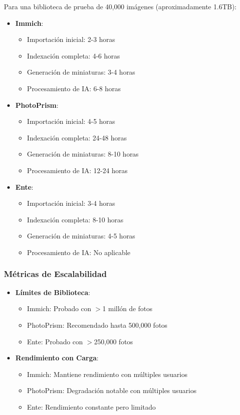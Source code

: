 Para una biblioteca de prueba de 40,000 imágenes (aproximadamente 1.6TB):

\begin{itemize}
    \item \textbf{Immich}:
    \begin{itemize}
        \item Importación inicial: 2-3 horas
        \item Indexación completa: 4-6 horas
        \item Generación de miniaturas: 3-4 horas
        \item Procesamiento de IA: 6-8 horas
    \end{itemize}

    \item \textbf{PhotoPrism}:
    \begin{itemize}
        \item Importación inicial: 4-5 horas
        \item Indexación completa: 24-48 horas
        \item Generación de miniaturas: 8-10 horas
        \item Procesamiento de IA: 12-24 horas
    \end{itemize}

    \item \textbf{Ente}:
    \begin{itemize}
        \item Importación inicial: 3-4 horas
        \item Indexación completa: 8-10 horas
        \item Generación de miniaturas: 4-5 horas
        \item Procesamiento de IA: No aplicable
    \end{itemize}
\end{itemize}

\subsubsection{Métricas de Escalabilidad}

\begin{itemize}
    \item \textbf{Límites de Biblioteca}:
    \begin{itemize}
        \item Immich: Probado con $>$1 millón de fotos
        \item PhotoPrism: Recomendado hasta 500,000 fotos
        \item Ente: Probado con $>$250,000 fotos
    \end{itemize}

    \item \textbf{Rendimiento con Carga}:
    \begin{itemize}
        \item Immich: Mantiene rendimiento con múltiples usuarios
        \item PhotoPrism: Degradación notable con múltiples usuarios
        \item Ente: Rendimiento constante pero limitado
    \end{itemize}
\end{itemize}

